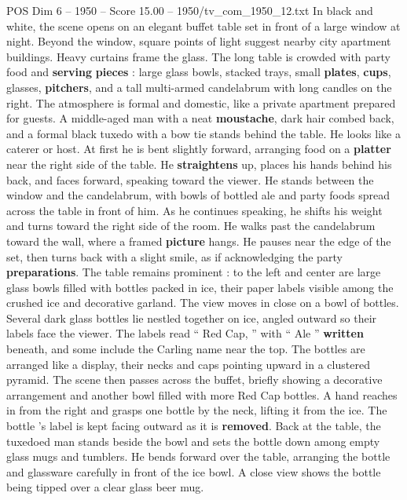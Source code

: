 \begin{textsample}{POS Dim 6 – 1950 – Score 15.00 – 1950/tv\_com\_1950\_12.txt}  \label{ex:f6_pos_006}
In black and white, the scene opens on an elegant buffet table set in front of a large window at night.
Beyond the window, square points of light suggest nearby city apartment buildings.
Heavy curtains frame the glass.
The long table is crowded with party food and \textbf{serving} \textbf{pieces} : large glass bowls, stacked trays, small \textbf{plates}, \textbf{cups}, glasses, \textbf{pitchers}, and a tall multi-armed candelabrum with long candles on the right.
The atmosphere is formal and domestic, like a private apartment prepared for guests.
A middle-aged man with a neat \textbf{moustache}, dark hair combed back, and a formal black tuxedo with a bow tie stands behind the table.
He looks like a caterer or host.
At first he is bent slightly forward, arranging food on a \textbf{platter} near the right side of the table.
He \textbf{straightens} up, places his hands behind his back, and faces forward, speaking toward the viewer.
He stands between the window and the candelabrum, with bowls of bottled ale and party foods spread across the table in front of him.
As he continues speaking, he shifts his weight and turns toward the right side of the room.
He walks past the candelabrum toward the wall, where a framed \textbf{picture} hangs.
He pauses near the edge of the set, then turns back with a slight smile, as if acknowledging the party \textbf{preparations}.
The table remains prominent : to the left and center are large glass bowls filled with bottles packed in ice, their paper labels visible among the crushed ice and decorative garland.
The view moves in close on a bowl of bottles.
Several dark glass bottles lie nestled together on ice, angled outward so their labels face the viewer.
The labels read “ Red Cap, ” with “ Ale ” \textbf{written} beneath, and some include the Carling name near the top.
The bottles are arranged like a display, their necks and caps pointing upward in a clustered pyramid.
The scene then passes across the buffet, briefly showing a decorative arrangement and another bowl filled with more Red Cap bottles.
A hand reaches in from the right and grasps one bottle by the neck, lifting it from the ice.
The bottle ’s label is kept facing outward as it is \textbf{removed}.
Back at the table, the tuxedoed man stands beside the bowl and sets the bottle down among empty glass mugs and tumblers.
He bends forward over the table, arranging the bottle and glassware carefully in front of the ice bowl.
A close view shows the bottle being tipped over a clear glass beer mug.

\end{textsample}
